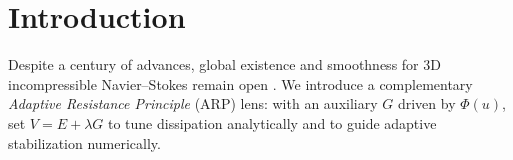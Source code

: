 \section{Introduction}
Despite a century of advances, global existence and smoothness for 3D incompressible Navier--Stokes remain open \citep{fefferman2006ns,clayproblem}.
We introduce a complementary \emph{Adaptive Resistance Principle} (ARP) lens: with an auxiliary $G$ driven by $\Phi(u)$, set $V=E+\lambda G$ to tune dissipation analytically and to guide adaptive stabilization numerically.
